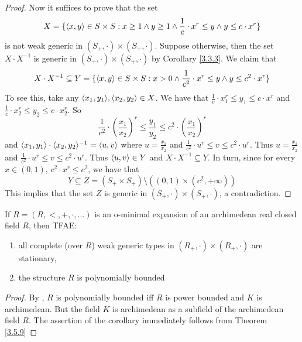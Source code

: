 \documentclass[11pt]{article}
\begin{document}
\begin{proof}
Now it suffices to prove that the set
\begin{equation*}
X=\{\langle x,y\rangle\in S\times S:x\ge 1\wedge y\ge 1\wedge\frac{1}{c}\cdot x^r\le y\wedge y\le c\cdot x^r\}
\end{equation*}
is not weak generic in \((S_+,\cdot)\times(S_+,\cdot)\). Suppose otherwise, then the set \(X\cdot X^{-1}\) is
generic in \((S_+,\cdot)\times(S_+,\cdot)\) by Corollary \ref{3.3.3}. We claim that
\begin{equation*}
X\cdot X^{-1}\subseteq Y=\{\langle x,y\rangle\in S\times S:x>0\wedge\frac{1}{c^2}\cdot x^r\le y\wedge y\le c^2\cdot x^r\}
\end{equation*}
To see this, take any \(\langle x_1,y_1\rangle,\langle x_2,y_2\rangle\in X\). We have that \(\frac{1}{c}\cdot x_1^r\le y_1\le c\cdot x^r\)
and \(\frac{1}{c}\cdot x_2^r\le y_2\le c\cdot x_2^r\). So
\begin{equation*}
\frac{1}{c^2}\cdot\left(\frac{x_1}{x_2}\right)^r\le\frac{y_1}{y_2}\le c^2\cdot\left( \frac{x_1}{x_2} \right)^r
\end{equation*}
and \(\langle x_1,y_1\rangle\cdot\langle x_2,y_2\rangle^{-1}=\langle u,v\rangle\) where \(u=\frac{x_1}{x_2}\)
and \(\frac{1}{c^2}\cdot u^r\le v\le c^2\cdot u^r\). Thus \(u=\frac{x_1}{x_2}\)
and \(\frac{1}{c^2}\cdot u^r\le v\le c^2\cdot u^r\). Thus \(\langle u,v\rangle\in Y\) and \(X\cdot X^{-1}\subseteq Y\). In turn, since for
every \(x\in(0,1)\), \(c^2\cdot x^r\le c^2\), we have that
\begin{equation*}
Y\subseteq Z=(S_+\times S_+)\setminus((0,1)\times (c^2,+\infty))
\end{equation*}
This implies that the set \(Z\) is generic in \((S_+,\cdot)\times(S_+,\cdot)\), a contradiction.
\end{proof}

\begin{corollary}[]
If \(R=(R,<,+,\cdot,\dots)\) is an o-minimal expansion of an archimedean real closed field \(R\), then
TFAE:
\begin{enumerate}
\item all complete (over \(R\)) weak generic types in \((R_+,\cdot)\times(R_+,\cdot)\) are stationary,
\item the structure \(R\) is polynomially bounded
\end{enumerate}
\end{corollary}

\begin{proof}
By \cite{miller1996growth}, \(R\) is polynomially bounded iff \(R\) is power bounded and \(K\) is
archimedean. But the field \(K\) is archimedean as a subfield of the archimedean field \(R\).
The assertion of the corollary immediately follows from Theorem \ref{3.5.9}
\end{proof}
\end{document}
